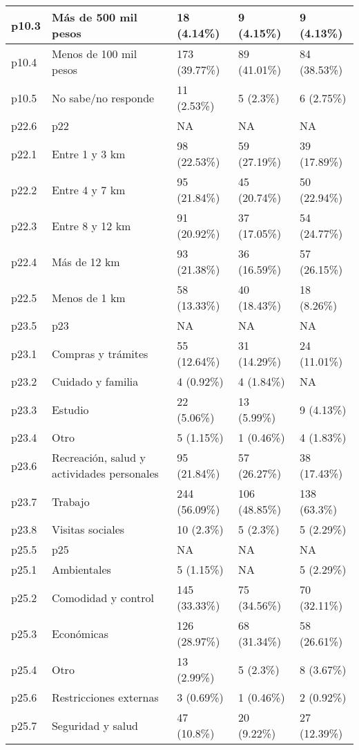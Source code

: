 \begin{table}
{\begin{tabular}[t]{l|l|l|l|l}
\hline
p10.3 & Más de 500 mil pesos & 18 (4.14\%) & 9 (4.15\%) & 9 (4.13\%)\\
\hline
p10.4 & Menos de 100 mil pesos & 173 (39.77\%) & 89 (41.01\%) & 84 (38.53\%)\\
\hline
p10.5 & No sabe/no responde & 11 (2.53\%) & 5 (2.3\%) & 6 (2.75\%)\\
\hline
p22.6 & p22 & NA & NA & NA\\
\hline
p22.1 & Entre 1 y 3 km & 98 (22.53\%) & 59 (27.19\%) & 39 (17.89\%)\\
\hline
p22.2 & Entre 4 y 7 km & 95 (21.84\%) & 45 (20.74\%) & 50 (22.94\%)\\
\hline
p22.3 & Entre 8 y 12 km & 91 (20.92\%) & 37 (17.05\%) & 54 (24.77\%)\\
\hline
p22.4 & Más de 12 km & 93 (21.38\%) & 36 (16.59\%) & 57 (26.15\%)\\
\hline
p22.5 & Menos de 1 km & 58 (13.33\%) & 40 (18.43\%) & 18 (8.26\%)\\
\hline
p23.5 & p23 & NA & NA & NA\\
\hline
p23.1 & Compras y trámites & 55 (12.64\%) & 31 (14.29\%) & 24 (11.01\%)\\
\hline
p23.2 & Cuidado y familia & 4 (0.92\%) & 4 (1.84\%) & NA\\
\hline
p23.3 & Estudio & 22 (5.06\%) & 13 (5.99\%) & 9 (4.13\%)\\
\hline
p23.4 & Otro & 5 (1.15\%) & 1 (0.46\%) & 4 (1.83\%)\\
\hline
p23.6 & Recreación, salud y actividades personales & 95 (21.84\%) & 57 (26.27\%) & 38 (17.43\%)\\
\hline
p23.7 & Trabajo & 244 (56.09\%) & 106 (48.85\%) & 138 (63.3\%)\\
\hline
p23.8 & Visitas sociales & 10 (2.3\%) & 5 (2.3\%) & 5 (2.29\%)\\
\hline
p25.5 & p25 & NA & NA & NA\\
\hline
p25.1 & Ambientales & 5 (1.15\%) & NA & 5 (2.29\%)\\
\hline
p25.2 & Comodidad y control & 145 (33.33\%) & 75 (34.56\%) & 70 (32.11\%)\\
\hline
p25.3 & Económicas & 126 (28.97\%) & 68 (31.34\%) & 58 (26.61\%)\\
\hline
p25.4 & Otro & 13 (2.99\%) & 5 (2.3\%) & 8 (3.67\%)\\
\hline
p25.6 & Restricciones externas & 3 (0.69\%) & 1 (0.46\%) & 2 (0.92\%)\\
\hline
p25.7 & Seguridad y salud & 47 (10.8\%) & 20 (9.22\%) & 27 (12.39\%)\\

\end{tabular}}
\end{table}
